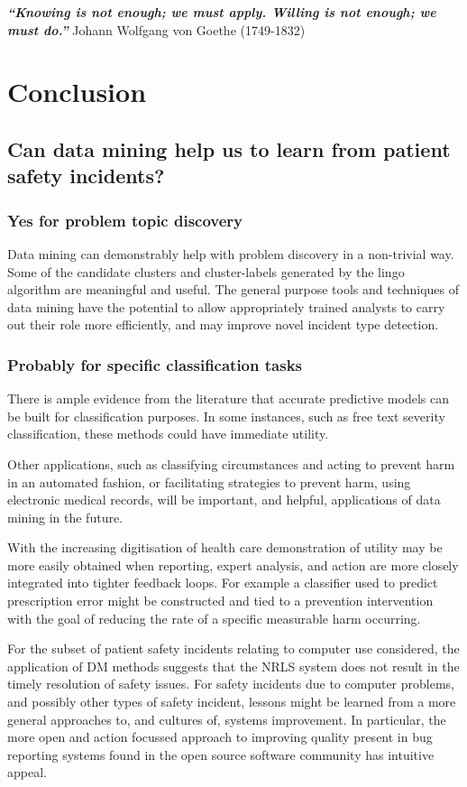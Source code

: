 \textbf{\textit{``Knowing is not enough; we must apply. Willing is not enough; we must do.''}}
Johann Wolfgang von Goethe (1749-1832)

\chapter{Conclusion}

\section{Can data mining help us to learn from patient safety incidents?}

\subsection{Yes for problem topic discovery}
Data mining can demonstrably help with problem discovery in a non-trivial way. Some of the candidate clusters and cluster-labels generated by the lingo algorithm are meaningful and useful. The general purpose tools and techniques of data mining have the potential to allow appropriately trained analysts to carry out their role more efficiently, and may improve novel incident type detection.

\subsection{Probably for specific classification tasks}
There is ample evidence from the literature that accurate predictive models can be built for classification purposes. In some instances, such as free text severity classification, these methods could have immediate utility.

Other applications, such as classifying circumstances and acting to prevent harm in an automated fashion, or facilitating strategies to prevent harm, using electronic medical records, will be important, and helpful, applications of data mining in the future.

With the increasing digitisation of health care demonstration of utility may be more easily obtained when reporting, expert analysis, and action are more closely integrated into tighter feedback loops. For example a classifier used to predict prescription error might be constructed and tied to a prevention intervention with the goal of reducing the rate of a specific measurable harm occurring. 

For the subset of patient safety incidents relating to computer use considered, the application of DM methods suggests that the NRLS system does not result in the timely resolution of safety issues. For safety incidents due to computer problems, and possibly other types of safety incident, lessons might be learned from a more general approaches to, and cultures of, systems improvement. In particular, the more open and action focussed approach to improving quality present in bug reporting systems found in the open source software community has intuitive appeal.

